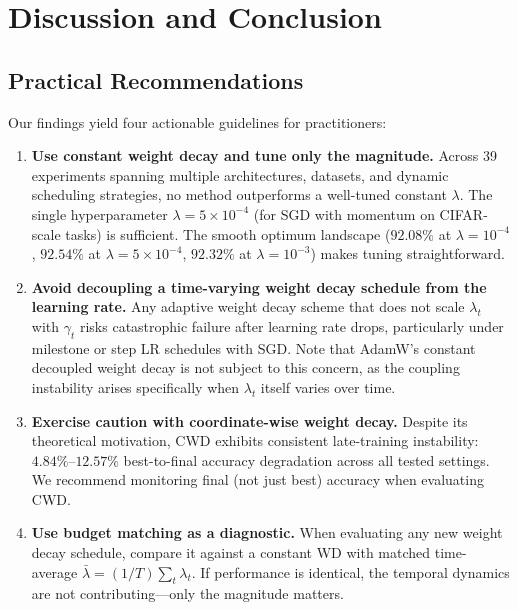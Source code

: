 \documentclass{article}
\begin{document}
\section{Discussion and Conclusion}
\label{sec:discussion}

\subsection{Practical Recommendations}

Our findings yield four actionable guidelines for practitioners:

\begin{enumerate}
  \item \textbf{Use constant weight decay and tune only the magnitude.}
        Across 39 experiments spanning multiple architectures, datasets, and dynamic
        scheduling strategies, no method outperforms a well-tuned constant $\lambda$.
        The single hyperparameter $\lambda = 5 \times 10^{-4}$ (for SGD with momentum
        on CIFAR-scale tasks) is sufficient.
        The smooth optimum landscape ($92.08\%$ at $\lambda = 10^{-4}$, $92.54\%$ at
        $\lambda = 5 \times 10^{-4}$, $92.32\%$ at $\lambda = 10^{-3}$) makes tuning
        straightforward.

  \item \textbf{Avoid decoupling a time-varying weight decay schedule from the
        learning rate.}
        Any adaptive weight decay scheme that does not scale $\lambda_t$ with
        $\gamma_t$ risks catastrophic failure after learning rate drops, particularly
        under milestone or step LR schedules with SGD.
        Note that AdamW's constant decoupled weight decay is not subject to this
        concern, as the coupling instability arises specifically when $\lambda_t$
        itself varies over time.

  \item \textbf{Exercise caution with coordinate-wise weight decay.}
        Despite its theoretical motivation, CWD \citep{liu2025cautious} exhibits
        consistent late-training instability:
        $4.84\%$--$12.57\%$ best-to-final accuracy degradation across all tested
        settings.
        We recommend monitoring final (not just best) accuracy when evaluating CWD.

  \item \textbf{Use budget matching as a diagnostic.}
        When evaluating any new weight decay schedule, compare it against a constant
        WD with matched time-average
        $\bar{\lambda} = (1/T)\sum_t \lambda_t$.
        If performance is identical, the temporal dynamics are not
        contributing---only the magnitude matters.
\end{enumerate}
\end{document}
